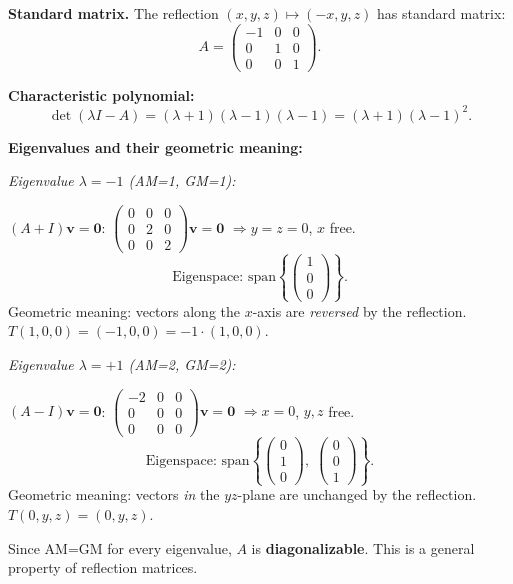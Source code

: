 \documentclass[12pt,a3paper]{article}
\begin{document}
\begin{tcolorbox}[enhanced,breakable,
  colback=cF!4,colframe=cF,boxrule=0.8pt,arc=5pt,
  title={\textbf{Answer --- Eigenvalues \& Eigenvectors: Reflection about the $yz$-Plane}},
  fonttitle=\bfseries\color{white},colbacktitle=cF]

\textbf{Standard matrix.} The reflection $(x,y,z)\mapsto(-x,y,z)$ has standard matrix:
\[
A=\begin{pmatrix}-1&0&0\\0&1&0\\0&0&1\end{pmatrix}.
\]

\textbf{Characteristic polynomial:}
\[
\det(\lambda I-A)=(\lambda+1)(\lambda-1)(\lambda-1)=(\lambda+1)(\lambda-1)^2.
\]

\textbf{Eigenvalues and their geometric meaning:}

\medskip
\textit{Eigenvalue $\lambda=-1$ (AM=1, GM=1):}

$(A+I)\mathbf{v}=\mathbf{0}$:
$\begin{pmatrix}0&0&0\\0&2&0\\0&0&2\end{pmatrix}\mathbf{v}=\mathbf{0}$
$\Rightarrow y=z=0$, $x$ free.
\[
\text{Eigenspace: }\mathrm{span}\!\left\{\begin{pmatrix}1\\0\\0\end{pmatrix}\right\}.
\]
Geometric meaning: vectors along the $x$-axis are \emph{reversed} by the reflection. $T(1,0,0)=(-1,0,0)=-1\cdot(1,0,0)$.

\medskip
\textit{Eigenvalue $\lambda=+1$ (AM=2, GM=2):}

$(A-I)\mathbf{v}=\mathbf{0}$:
$\begin{pmatrix}-2&0&0\\0&0&0\\0&0&0\end{pmatrix}\mathbf{v}=\mathbf{0}$
$\Rightarrow x=0$, $y,z$ free.
\[
\text{Eigenspace: }\mathrm{span}\!\left\{\begin{pmatrix}0\\1\\0\end{pmatrix},\;\begin{pmatrix}0\\0\\1\end{pmatrix}\right\}.
\]
Geometric meaning: vectors \emph{in} the $yz$-plane are unchanged by the reflection. $T(0,y,z)=(0,y,z)$.

\medskip
Since AM=GM for every eigenvalue, $A$ is \textbf{diagonalizable}. This is a general property of reflection matrices.

\end{tcolorbox}
\end{document}
